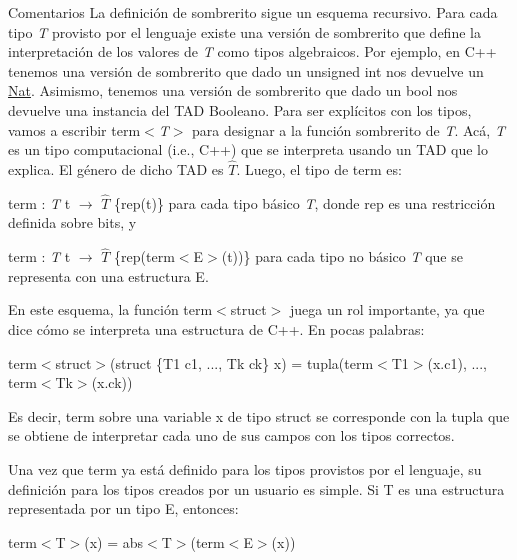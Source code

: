 \begin{DoxyRemark}{\-Comentarios}
\-La definición de sombrerito sigue un esquema recursivo. \-Para cada tipo {\itshape \-T\/} provisto por el lenguaje existe una versión de sombrerito que define la interpretación de los valores de {\itshape \-T\/} como tipos algebraicos. \-Por ejemplo, en \-C++ tenemos una versión de sombrerito que dado un unsigned int nos devuelve un \hyperlink{classNat}{\-Nat}. \-Asimismo, tenemos una versión de sombrerito que dado un bool nos devuelve una instancia del \-T\-A\-D \-Booleano. \-Para ser explícitos con los tipos, vamos a escribir term$<${\itshape \-T$>$\/} para designar a la función sombrerito de {\itshape \-T\/}. \-Acá, {\itshape \-T\/} es un tipo computacional (i.\-e., \-C++) que se interpreta usando un \-T\-A\-D que lo explica. \-El género de dicho \-T\-A\-D es $\widehat{T}$. \-Luego, el tipo de term es\-:
\begin{DoxyEnumerate}
\item term \-: {\itshape \-T\/} t $\to$ $\widehat{T}$ \{rep(t)\} para cada tipo básico {\itshape \-T\/}, donde rep es una restricción definida sobre bits, y
\item term \-: {\itshape \-T\/} t $\to$ $\widehat{T}$ \{rep(term$<$\-E$>$(t))\} para cada tipo no básico {\itshape \-T\/} que se representa con una estructura \-E.
\end{DoxyEnumerate}
\end{DoxyRemark}
\-En este esquema, la función term$<$struct$>$ juega un rol importante, ya que dice cómo se interpreta una estructura de \-C++. \-En pocas palabras\-:
\begin{DoxyItemize}
\item term$<$struct$>$(struct \{\-T1 c1, ..., \-Tk ck\} x) = tupla(term$<$\-T1$>$(x.\-c1), ..., term$<$\-Tk$>$(x.\-ck))
\end{DoxyItemize}

\-Es decir, term sobre una variable x de tipo struct se corresponde con la tupla que se obtiene de interpretar cada uno de sus campos con los tipos correctos.

\-Una vez que term ya está definido para los tipos provistos por el lenguaje, su definición para los tipos creados por un usuario es simple. \-Si \-T es una estructura representada por un tipo \-E, entonces\-:
\begin{DoxyItemize}
\item term$<$\-T$>$(x) = abs$<$\-T$>$(term$<$\-E$>$(x))
\end{DoxyItemize}

